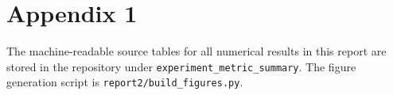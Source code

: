 \chapter*{Appendix 1}\label{app1}

The machine-readable source tables for all numerical results in this report are
stored in the repository under \texttt{experiment\_metric\_summary}. The figure
generation script is \texttt{report2/build\_figures.py}.
